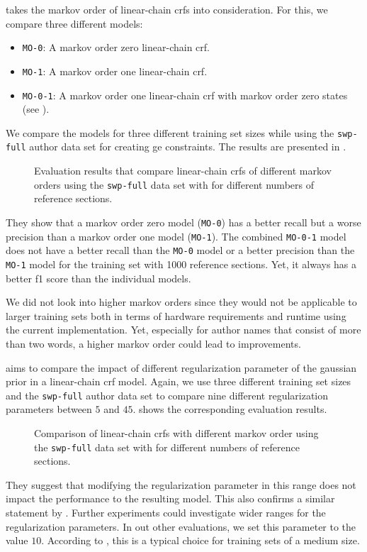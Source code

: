  takes the \gls{markov order} of \glspl{linear-chain crf} into consideration.
For this, we compare three different models:
\begin{itemize}
  \item \texttt{MO-0}: A \gls{markov order} zero \gls{linear-chain crf}.
  \item \texttt{MO-1}: A \gls{markov order} one \gls{linear-chain crf}.
  \item \texttt{MO-0-1}: A \gls{markov order} one \gls{linear-chain crf} with \gls{markov order} zero states (see ).
\end{itemize}
We compare the models for three different training set sizes while using the \texttt{swp-full} author data set for creating \gls{ge} constraints.
The results are presented in .
\begin{figure}[t]

\caption{Evaluation results that compare \glspl{linear-chain crf} of different \glspl{markov order} using the \texttt{swp-full} data set with for different numbers of reference sections.}
\label{fig:eval-markov-orders}
\end{figure}
They show that a \gls{markov order} zero model (\texttt{MO-0}) has a better \gls{recall} but a worse \gls{precision} than a \gls{markov order} one model (\texttt{MO-1}).
The combined \texttt{MO-0-1} model does not have a better recall than the \texttt{MO-0} model or a better precision than the \texttt{MO-1} model for the training set with \num{1000} reference sections.
Yet, it always has a better \gls{f1 score} than the individual models.

We did not look into higher \glspl{markov order} since they would not be applicable to larger training sets both in terms of hardware requirements and runtime using the current implementation.
Yet, especially for author names that consist of more than two words, a higher \gls{markov order} could lead to improvements.

\bigskip

 aims to compare the impact of different \gls{regularization parameter} of the \gls{gaussian prior} in a \gls{linear-chain crf} model.
Again, we use three different training set sizes and the \texttt{swp-full} author data set to compare nine different \glspl{regularization parameter} between $5$ and $45$.
 shows the corresponding evaluation results.
\begin{figure}[t]

\caption{Comparison of \glspl{linear-chain crf} with different \gls{markov order} using the \texttt{swp-full} data set with for different numbers of reference sections.}
\label{fig:eval-gaussian}
\end{figure}
They suggest that modifying the \gls{regularization parameter} in this range does not impact the performance to the resulting model.
This also confirms a similar statement by \citet{sutton2010introduction}.
Further experiments could investigate wider ranges for the \glspl{regularization parameter}.
In out other evaluations, we set this parameter to the value $10$.
According to \citet{sutton2010introduction}, this is a typical choice for training sets of a medium size.

